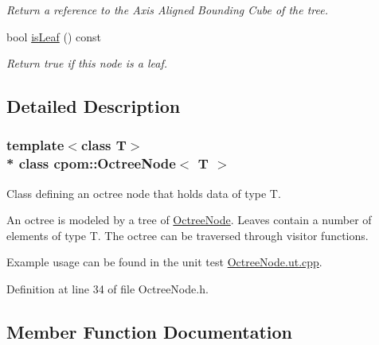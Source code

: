 \begin{DoxyCompactItemize}
\begin{DoxyCompactList}\small\item\em Return a reference to the Axis Aligned Bounding Cube of the tree. \end{DoxyCompactList}\item 
bool \hyperlink{classcpom_1_1_octree_node_a653c782edb053eb55d91265ad156008e}{is\+Leaf} () const \hypertarget{classcpom_1_1_octree_node_a653c782edb053eb55d91265ad156008e}{}\label{classcpom_1_1_octree_node_a653c782edb053eb55d91265ad156008e}

\begin{DoxyCompactList}\small\item\em Return true if this node is a leaf. \end{DoxyCompactList}\end{DoxyCompactItemize}


\subsection{Detailed Description}
\subsubsection*{template$<$class T$>$\\*
class cpom\+::\+Octree\+Node$<$ T $>$}

Class defining an octree node that holds data of type T. 

An octree is modeled by a tree of \hyperlink{classcpom_1_1_octree_node}{Octree\+Node}. Leaves contain a number of elements of type T. The octree can be traversed through visitor functions.

Example usage can be found in the unit test \hyperlink{_octree_node_8ut_8cpp}{Octree\+Node.\+ut.\+cpp}. 

Definition at line 34 of file Octree\+Node.\+h.



\subsection{Member Function Documentation}
